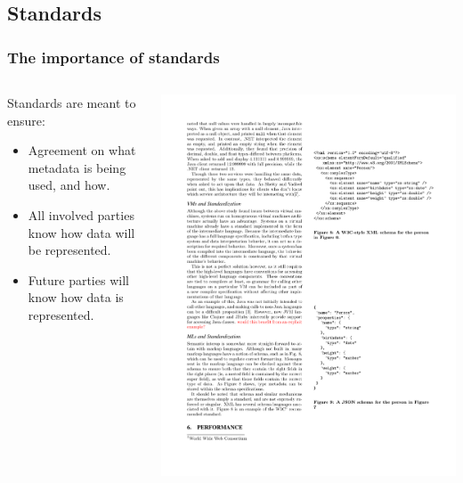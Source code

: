 \documentclass{beamer}
\begin{document}
\subsection{Standards}

\begin{frame}
  \frametitle{The importance of standards}
  \begin{columns}
  \begin{column}{0.6\textwidth}
  Standards are meant to ensure:
  \begin{itemize}
  	\item Agreement on what metadata is being used, and how.
	\item All involved parties know how data will be represented.
	\item Future parties will know how data is represented.
  \end{itemize}
  \end{column}

  \begin{column}{0.5\textwidth}
    \includegraphics[scale=0.9]{graphics/JSONSchema.pdf}
  \end{column}
  \end{columns}
\end{frame}
\end{document}
